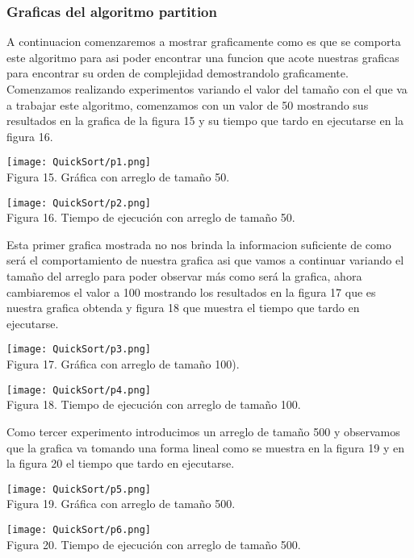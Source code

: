 \documentclass[12pt,twoside]{article}
\begin{document}
\subsubsection{Graficas del algoritmo partition}
A continuacion comenzaremos a mostrar graficamente como es que se comporta este algoritmo para asi poder encontrar una funcion que acote nuestras graficas para encontrar su orden de complejidad demostrandolo graficamente. Comenzamos realizando experimentos variando el valor del tamaño con el que va a trabajar este algoritmo, comenzamos con un valor de 50 mostrando sus resultados en la grafica de la figura 15 y su tiempo que tardo en ejecutarse en la figura 16.
\begin{center}
    \texttt{[image: QuickSort/p1.png]}\\
    Figura 15. Gr\'afica con arreglo de tamaño 50.
\end{center}
\begin{center}
    \texttt{[image: QuickSort/p2.png]}\\
    Figura 16. Tiempo de ejecuci\'on con arreglo de tamaño 50.
\end{center}
Esta primer grafica mostrada no nos brinda la informacion suficiente de como será el comportamiento de nuestra grafica asi que vamos a continuar variando el tamaño del arreglo para poder observar más como será la grafica, ahora cambiaremos el valor a 100 mostrando los resultados en la figura 17 que es nuestra grafica obtenda y figura 18 que muestra el tiempo que tardo en ejecutarse.
\begin{center}
    \texttt{[image: QuickSort/p3.png]}\\
    Figura 17. Gr\'afica con arreglo de tamaño 100).
\end{center}
\begin{center}
    \texttt{[image: QuickSort/p4.png]}\\
    Figura 18. Tiempo de ejecuci\'on con arreglo de tamaño 100.
\end{center}
Como tercer experimento introducimos un arreglo de tamaño 500 y observamos que la grafica va tomando una forma lineal como se muestra en la figura 19 y en la figura 20 el tiempo que tardo en ejecutarse.
\begin{center}
    \texttt{[image: QuickSort/p5.png]}\\
    Figura 19. Gr\'afica con arreglo de tamaño 500.
\end{center}
\begin{center}
    \texttt{[image: QuickSort/p6.png]}\\
    Figura 20. Tiempo de ejecuci\'on con arreglo de tamaño 500.
\end{center}
\end{document}
